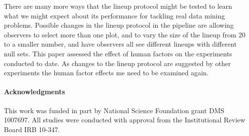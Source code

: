 \documentclass[10pt]{article}\usepackage[]{graphicx}\usepackage[]{color}
\begin{document}



There are many more ways that the lineup protocol might be tested to learn what we might expect about its performance for tackling real data mining problems. Possible changes in the lineup protocol in the pipeline are allowing observers to select more than one plot, and to vary the size of the lineup from 20 to a smaller number, and have observers all see different lineups with different null sets.  This paper assessed the effect of human factors on the experiments conducted to date. As changes to the lineup protocol are suggested by other experiments the human factor effects me need to be examined again.

\paragraph{Acknowledgments}
This work was funded in part by National Science Foundation grant DMS 1007697. All studies were conducted with approval from the Institutional Review Board IRB 10-347.




\end{document}
